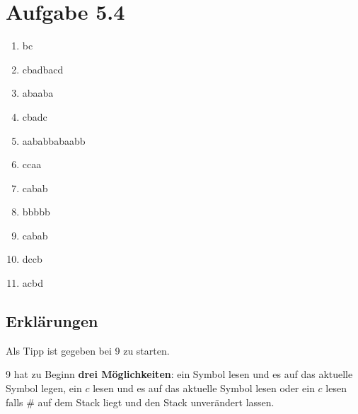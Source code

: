 \documentclass{article}
\begin{document}
\begin{center}
\end{center}

\section*{Aufgabe 5.4}
\begin{enumerate}
	\item bc
	\item cbadbacd
	\item abaaba
	\item cbadc
	\item aababbabaabb
	\item ccaa
	\item cabab
	\item bbbbb
  \item cabab
	\item dccb
  \item acbd
\end{enumerate}

\subsection*{Erklärungen}
Als Tipp ist gegeben bei 9 zu starten.

\bigskip

9 hat zu Beginn \textbf{drei Möglichkeiten}: ein Symbol lesen und es auf das aktuelle Symbol legen, ein $c$ lesen und es auf das aktuelle Symbol lesen oder ein $c$ lesen falls \# auf dem Stack liegt und den Stack unverändert lassen.
\end{document}
